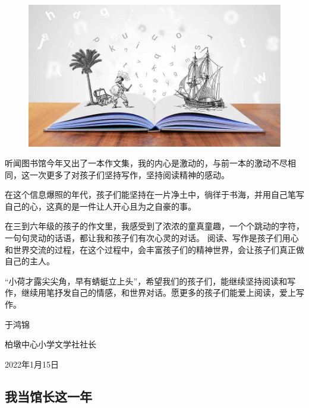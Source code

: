 \begin{figure}[htbp]

\centering

\includegraphics[width = .5\textwidth]{./ch/yhj.jpeg}

\end{figure}



 
听闻图书馆今年又出了一本作文集，我的内心是激动的，与前一本的激动不尽相同，这一次更多了对孩子们坚持写作，坚持阅读精神的感动。

在这个信息爆照的年代，孩子们能坚持在一片净土中，徜徉于书海，并用自己笔写自己的心，这真的是一件让人开心且为之自豪的事。

在三到六年级的孩子的作文里，我感受到了浓浓的童真童趣，一个个跳动的字符，一句句灵动的话语，都让我和孩子们有次心灵的对话。
阅读、写作是孩子们用心和世界交流的过程，在这个过程中，会丰富孩子们的精神世界，会让孩子们真正做自己的主人。

“小荷才露尖尖角，早有蜻蜓立上头”，希望我们的孩子们，能继续坚持阅读和写作，继续用笔抒发自己的情感，和世界对话。愿更多的孩子们能爱上阅读，爱上写作。
   

 


\vspace{10pt}

 于鸿锦

柏墩中心小学文学社社长

2022年1月15日
                



\vspace{10pt}

\hline


\vspace{10pt}

{\centering\subsection*{我当馆长这一年}}


\renewcommand{\leftmark}{我当馆长这一年}

